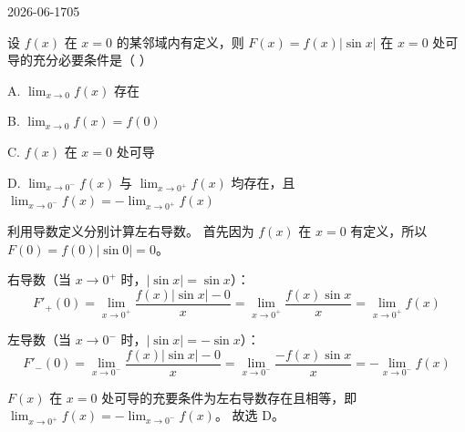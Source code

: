 \begin{mistake}{2026-06-17}{05}

\begin{problemcontent}
设 \(f(x)\) 在 \(x=0\) 的某邻域内有定义，则 \(F(x) = f(x)|\sin x|\) 在 \(x=0\) 处可导的充分必要条件是（  ）

A. \(\lim_{x\to0} f(x)\) 存在

B. \(\lim_{x\to0} f(x) = f(0)\)

C. \(f(x)\) 在 \(x=0\) 处可导

D. \(\lim_{x\to0^-} f(x)\) 与 \(\lim_{x\to0^+} f(x)\) 均存在，且 \(\lim_{x\to0^-} f(x) = -\lim_{x\to0^+} f(x)\)
\end{problemcontent}

\begin{solutioncontent}
利用导数定义分别计算左右导数。
首先因为 \(f(x)\) 在 \(x=0\) 有定义，所以 \(F(0) = f(0)|\sin 0| = 0\)。

右导数（当 \(x \to 0^+\) 时，\(|\sin x| = \sin x\)）：
\[
F'_+(0) = \lim_{x \to 0^+} \frac{f(x)|\sin x| - 0}{x} = \lim_{x \to 0^+} \frac{f(x)\sin x}{x} = \lim_{x \to 0^+} f(x)
\]

左导数（当 \(x \to 0^-\) 时，\(|\sin x| = -\sin x\)）：
\[
F'_-(0) = \lim_{x \to 0^-} \frac{f(x)|\sin x| - 0}{x} = \lim_{x \to 0^-} \frac{-f(x)\sin x}{x} = -\lim_{x \to 0^-} f(x)
\]

\(F(x)\) 在 \(x=0\) 处可导的充要条件为左右导数存在且相等，即 \(\lim_{x \to 0^+} f(x) = -\lim_{x \to 0^-} f(x)\)。
故选 D。
\end{solutioncontent}


\end{mistake}
